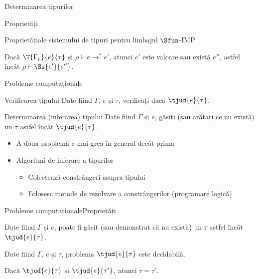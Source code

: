 \documentclass[xcolor=x11names,compress,10pt]{beamer}
\begin{document}
\begin{section}{Determinarea tipurilor}
\begin{subsection}{Proprietăți}
\begin{frame}{Proprietăți}{ale sistemului de tipuri pentru limbajul $\Sfun$-IMP}
    \vfill
    \begin{theorem}
    Dacă $\T{\Gamma_\rho}{e}{\tau}$ și $\rho\vdash {e}\longrightarrow^\ast{e'}$, atunci $e'$ este valoare sau există $e''$, astfel încât $\rho \vdash \Ss{e'}{e''}$.
    \end{theorem}
    
    \end{frame}
    
    \begin{frame}{Probleme computaționale}
    \begin{block}{Verificarea tipului}
    Date fiind $\Gamma$, $e$ și $\tau$, verificați dacă $\tjud{e}{\tau}$.
    \end{block}
    
    \begin{block}{Determinarea (inferarea) tipului}
    Date fiind $\Gamma$ și $e$, găsiți (sau arătați ce nu există) un $\tau$ astfel încât $\tjud{e}{\tau}$.
    \end{block}
    
    \begin{itemize}
    \item A doua problemă e mai grea în general decât prima
    \item Algoritmi de inferare a tipurilor
    \begin{itemize}
    \item Colectează constrângeri asupra tipului
    \item Folosesc metode de rezolvare a constrângerilor (programare logică)
    \end{itemize}
    \end{itemize}
    \end{frame}
    
    \begin{frame}{Probleme computaționale}{Proprietăți}
    \begin{theorem}
    Date fiind $\Gamma$ și $e$, poate fi găsit (sau demonstrat că nu există) un $\tau$ astfel încât 
    $\tjud{e}{\tau}$.
    \end{theorem}
    \vfill
    
    \begin{theorem}
    Date fiind $\Gamma$, $e$ și $\tau$, problema $\tjud{e}{\tau}$ este decidabilă.
    \end{theorem}
    
    \vfill
    \begin{theorem}
    Dacă $\tjud{e}{\tau}$ și $\tjud{e}{\tau'}$, atunci $\tau=\tau'$.
    \end{theorem}
    \end{frame}
    

\end{subsection}
\end{section}
\end{document}

